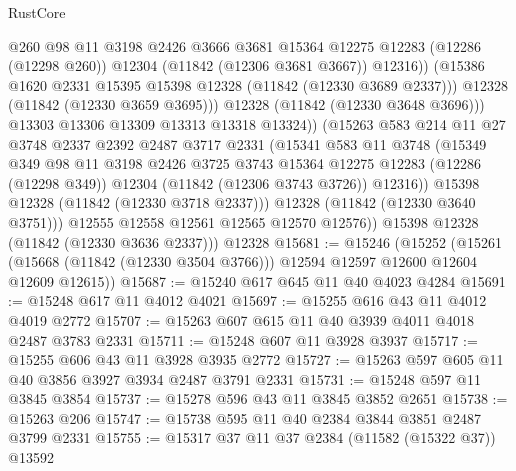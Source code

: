\begin{lexlean}{RustCore}
\begin{coremodule}
                        @260
                        @98
                        @11
                        @3198
                        @2426
                        @3666
                        @3681
                        @15364
                        @12275
                        @12283
                        (@12286 (@12298 @260))
                        @12304
                        (@11842 (@12306 @3681 @3667))
                        @12316))
                    (@15386 @1620 @2331 @15395 @15398 @12328 (@11842 (@12330 @3689 @2337)))
                    @12328
                    (@11842 (@12330 @3659 @3695)))
                  @12328
                  (@11842 (@12330 @3648 @3696)))
                @13303
                @13306
                @13309
                @13313
                @13318
                @13324))
            (@15263
              @583
              @214
              @11
              @27
              @3748
              @2337
              @2392
              @2487
              @3717
              @2331
              (@15341
                @583
                @11
                @3748
                (@15349
                  @349
                  @98
                  @11
                  @3198
                  @2426
                  @3725
                  @3743
                  @15364
                  @12275
                  @12283
                  (@12286 (@12298 @349))
                  @12304
                  (@11842 (@12306 @3743 @3726))
                  @12316))
              @15398
              @12328
              (@11842 (@12330 @3718 @2337)))
            @12328
            (@11842 (@12330 @3640 @3751)))
          @12555
          @12558
          @12561
          @12565
          @12570
          @12576))
      @15398
      @12328
      (@11842 (@12330 @3636 @2337)))
    @12328
@15681 := @15246
    (@15252
      (@15261 (@15668 (@11842 (@12330 @3504 @3766))) @12594 @12597 @12600 @12604 @12609 @12615))
@15687 := @15240 @617 @645 @11 @40 @4023 @4284
@15691 := @15248 @617 @11 @4012 @4021
@15697 := @15255 @616 @43 @11 @4012 @4019 @2772
@15707 := @15263 @607 @615 @11 @40 @3939 @4011 @4018 @2487 @3783 @2331
@15711 := @15248 @607 @11 @3928 @3937
@15717 := @15255 @606 @43 @11 @3928 @3935 @2772
@15727 := @15263 @597 @605 @11 @40 @3856 @3927 @3934 @2487 @3791 @2331
@15731 := @15248 @597 @11 @3845 @3854
@15737 := @15278 @596 @43 @11 @3845 @3852 @2651
@15738 := @15263 @206
@15747 := @15738 @595 @11 @40 @2384 @3844 @3851 @2487 @3799 @2331
@15755 := @15317 @37 @11 @37 @2384 (@11582 (@15322 @37)) @13592

\end{coremodule}
\end{lexlean}
